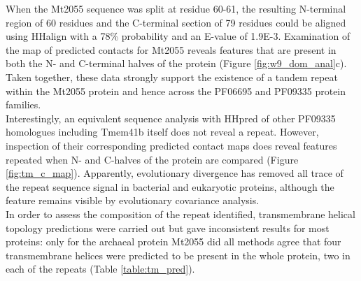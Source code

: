 When the Mt2055 sequence was split at residue 60-61, the resulting N-terminal region of 60 residues and the C-terminal section of 79 residues could be aligned using HHalign \cite{Soding2005} with a 78\% probability and an E-value of 1.9E-3. Examination of the map of predicted contacts for Mt2055 reveals features that are present in both the N- and C-terminal halves of the protein (Figure \ref{fig:w9_dom_anal}c). Taken together, these data strongly support the existence of a tandem repeat within the Mt2055 protein and hence across the PF06695 and PF09335 protein families.\\
Interestingly, an equivalent sequence analysis with HHpred of other PF09335 homologues including Tmem41b itself does not reveal a repeat. However, inspection of their corresponding predicted contact maps does reveal features repeated when N- and C-halves of the protein are compared (Figure \ref{fig:tm_c_map}). Apparently, evolutionary divergence has removed all trace of the repeat sequence signal in bacterial and eukaryotic proteins, although the feature remains visible by evolutionary covariance analysis.\\

In order to assess the composition of the repeat identified, transmembrane helical topology predictions were carried out but gave inconsistent results for most proteins: only for the archaeal protein Mt2055 did all methods agree that four transmembrane helices were predicted to be present in the whole protein, two in each of the repeats (Table \ref{table:tm_pred}).

